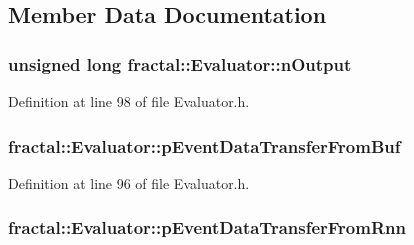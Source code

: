 \subsection{Member Data Documentation}
\hypertarget{classfractal_1_1Evaluator_a2bfee4084662b6816c8c07c818f7482e}{
\subsubsection[{n\+Output}]{\setlength{\rightskip}{0pt plus 5cm}unsigned long fractal\+::\+Evaluator\+::n\+Output\hspace{0.3cm}{\ttfamily [protected]}}}\label{classfractal_1_1Evaluator_a2bfee4084662b6816c8c07c818f7482e}


Definition at line 98 of file Evaluator.\+h.

\hypertarget{classfractal_1_1Evaluator_adc747963637fee84d11bae8101f0545f}{
\subsubsection[{p\+Event\+Data\+Transfer\+From\+Buf}]{ fractal\+::\+Evaluator\+::p\+Event\+Data\+Transfer\+From\+Buf\hspace{0.3cm}{\ttfamily [protected]}}}\label{classfractal_1_1Evaluator_adc747963637fee84d11bae8101f0545f}


Definition at line 96 of file Evaluator.\+h.

\hypertarget{classfractal_1_1Evaluator_a58cc420ff3c4d3eb859afc74c9fb3efa}{
\subsubsection[{p\+Event\+Data\+Transfer\+From\+Rnn}]{ fractal\+::\+Evaluator\+::p\+Event\+Data\+Transfer\+From\+Rnn\hspace{0.3cm}{\ttfamily [protected]}}}\label{classfractal_1_1Evaluator_a58cc420ff3c4d3eb859afc74c9fb3efa}


